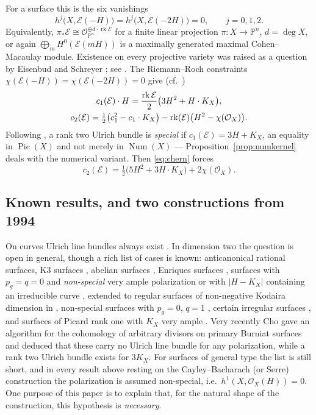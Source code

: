 \documentclass[10pt,a4paper]{amsart}
\newcommand{\OO}{\mathcal{O}}
\newcommand{\EE}{\mathcal{E}}
\newcommand{\PP}{\mathbb{P}}
\newcommand{\Num}{\operatorname{Num}}
\newcommand{\Pic}{\operatorname{Pic}}
\newcommand{\rk}{\operatorname{rk}}
\begin{document}
For a surface this is the six vanishings
\begin{equation}\label{eq:ulrich-vanishing}
h^j\bigl(X,\EE(-H)\bigr)=h^j\bigl(X,\EE(-2H)\bigr)=0,\qquad j=0,1,2 .
\end{equation}
Equivalently, $\pi_*\EE\cong\OO_{\PP^n}^{\oplus d\cdot\rk\EE}$ for a finite linear projection $\pi:X\to\PP^n$, $d=\deg X$, or again $\bigoplus_mH^0(\EE(mH))$ is a maximally generated maximal Cohen--Macaulay module. Existence on every projective variety was raised as a question by Eisenbud and Schreyer \cite{ES03}; see \cite{Bea18,Cos17}. The Riemann--Roch constraints $\chi(\EE(-H))=\chi(\EE(-2H))=0$ give (cf.\ \cite[\S2]{Cas17})
\begin{gather}
c_1(\EE)\cdot H=\frac{\rk\EE}{2}\bigl(3H^2+H\cdot K_X\bigr),\label{eq:chern}\\
c_2(\EE)=\tfrac12\bigl(c_1^2-c_1\cdot K_X\bigr)-\rk(\EE)\bigl(H^2-\chi(\OO_X)\bigr).\notag
\end{gather}
Following \cite{ES03,Cas17}, a rank two Ulrich bundle is \emph{special} if $c_1(\EE)=3H+K_X$, an equality in $\Pic(X)$ and not merely in $\Num(X)$ --- Proposition~\ref{prop:numkernel} deals with the numerical variant. Then \eqref{eq:chern} forces
\begin{equation}\label{eq:c2special}
c_2(\EE)=\tfrac12\bigl(5H^2+3H\cdot K_X\bigr)+2\chi(\OO_X).
\end{equation}

\subsection{Known results, and two constructions from 1994}
On curves Ulrich line bundles always exist \cite{ES03}. In dimension two the question is open in general, though a rich list of cases is known: anticanonical rational surfaces, K3 surfaces \cite{AFO17,Fae19}, abelian surfaces \cite{Bea16}, Enriques surfaces \cite{BN18}, surfaces with $p_g=q=0$ and \emph{non-special} very ample polarization \cite{Cas17} or with $|H-K_X|$ containing an irreducible curve \cite{Bea16b}, extended to regular surfaces of non-negative Kodaira dimension in \cite{Cas22}, non-special surfaces with $p_g=0$, $q=1$ \cite{Cas19}, certain irregular surfaces \cite{Lop21}, and surfaces of Picard rank one with $K_X$ very ample \cite{BP24}. Very recently Cho \cite{Cho26} gave an algorithm for the cohomology of arbitrary divisors on primary Burniat surfaces and deduced that these carry no Ulrich line bundle for any polarization, while a rank two Ulrich bundle exists for $3K_X$. For surfaces of general type the list is still short, and in every result above resting on the Cayley--Bacharach (or Serre) construction the polarization is assumed non-special, i.e.\ $h^1(X,\OO_X(H))=0$. One purpose of this paper is to explain that, for the natural shape of the construction, this hypothesis is \emph{necessary}.
\end{document}
